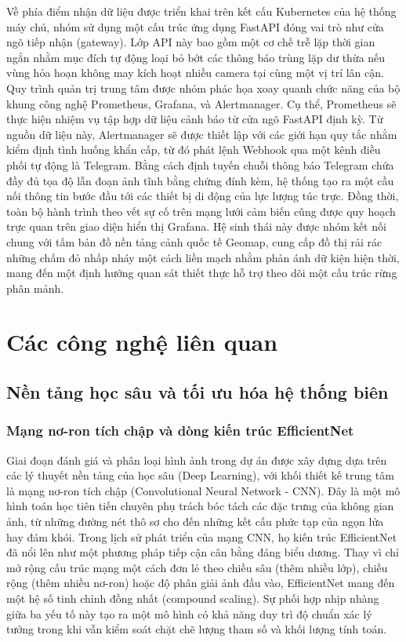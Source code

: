 \documentclass[12pt,a4paper]{report}
\begin{document}
Về phía điểm nhận dữ liệu được triển khai trên kết cấu Kubernetes của hệ thống máy chủ, nhóm sử dụng một cấu trúc ứng dụng FastAPI đóng vai trò như cửa ngõ tiếp nhận (gateway). Lớp API này bao gồm một cơ chế trễ lặp thời gian ngắn nhằm mục đích tự động loại bỏ bớt các thông báo trùng lặp dư thừa nếu vùng hỏa hoạn không may kích hoạt nhiều camera tại cùng một vị trí lân cận. Quy trình quản trị trung tâm được nhóm phác họa xoay quanh chức năng của bộ khung công nghệ Prometheus, Grafana, và Alertmanager. Cụ thể, Prometheus sẽ thực hiện nhiệm vụ tập hợp dữ liệu cảnh báo từ cửa ngõ FastAPI định kỳ. Từ nguồn dữ liệu này, Alertmanager sẽ được thiết lập với các giới hạn quy tắc nhằm kiểm định tình huống khẩn cấp, từ đó phát lệnh Webhook qua một kênh điều phối tự động là Telegram. Bằng cách định tuyến chuỗi thông báo Telegram chứa đầy đủ tọa độ lẫn đoạn ảnh tĩnh bằng chứng đính kèm, hệ thống tạo ra một cầu nối thông tin bước đầu tới các thiết bị di động của lực lượng túc trực. Đồng thời, toàn bộ hành trình theo vết sự cố trên mạng lưới cảm biến cũng được quy hoạch trực quan trên giao diện hiển thị Grafana. Hệ sinh thái này được nhóm kết nối chung với tấm bản đồ nền tảng cảnh quốc tế Geomap, cung cấp đồ thị rải rác những chấm đỏ nhấp nháy một cách liền mạch nhằm phản ánh dữ kiện hiện thời, mang đến một định hướng quan sát thiết thực hỗ trợ theo dõi một cấu trúc rừng phân mảnh.

\chapter{Các công nghệ liên quan}

\section{Nền tảng học sâu và tối ưu hóa hệ thống biên}

\subsection{Mạng nơ-ron tích chập và dòng kiến trúc EfficientNet}

Giai đoạn đánh giá và phân loại hình ảnh trong dự án được xây dựng dựa trên các lý thuyết nền tảng của học sâu (Deep Learning), với khối thiết kế trung tâm là mạng nơ-ron tích chập (Convolutional Neural Network - CNN). Đây là một mô hình toán học tiên tiến chuyên phụ trách bóc tách các đặc trưng của không gian ảnh, từ những đường nét thô sơ cho đến những kết cấu phức tạp của ngọn lửa hay đám khói. Trong lịch sử phát triển của mạng CNN, họ kiến trúc EfficientNet \cite{tan2019efficientnet} đã nổi lên như một phương pháp tiếp cận cân bằng đáng biểu dương. Thay vì chỉ mở rộng cấu trúc mạng một cách đơn lẻ theo chiều sâu (thêm nhiều lớp), chiều rộng (thêm nhiều nơ-ron) hoặc độ phân giải ảnh đầu vào, EfficientNet mang đến một hệ số tinh chỉnh đồng nhất (compound scaling). Sự phối hợp nhịp nhàng giữa ba yếu tố này tạo ra một mô hình có khả năng duy trì độ chuẩn xác lý tưởng trong khi vẫn kiểm soát chặt chẽ lượng tham số và khối lượng tính toán. 
\end{document}
